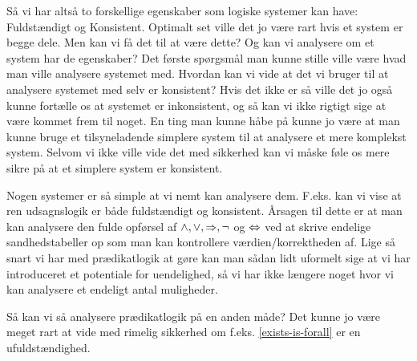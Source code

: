 Så vi har altså to forskellige egenskaber som logiske systemer kan have: Fuldstændigt og Konsistent.
Optimalt set ville det jo være rart hvis et system er begge dele.
Men kan vi få det til at være dette? Og kan vi analysere om et system har de egenskaber?
Det første spørgsmål man kunne stille ville være hvad man ville analysere systemet med. Hvordan kan vi vide at det
vi bruger til at analysere systemet med selv er konsistent? Hvis det ikke er så ville det jo også kunne fortælle
os at systemet er inkonsistent, og så kan vi ikke rigtigt sige at være kommet frem til noget.
En ting man kunne håbe på kunne jo være at man kunne bruge et tilsyneladende simplere system til at analysere et mere komplekst system.
Selvom vi ikke ville vide det med sikkerhed kan vi måske føle os mere sikre på at et simplere system er konsistent.

Nogen systemer er så simple at vi nemt kan analysere dem. F.eks. kan vi vise at ren udsagnslogik er både fuldstændigt og konsistent.
Årsagen til dette er at man kan analysere den fulde opførsel af $\land,\lor,\Rightarrow,\neg$ og $\Leftrightarrow$ ved at skrive endelige sandhedstabeller op som man
kan kontrollere værdien/korrektheden af. Lige så snart vi har med prædikatlogik at gøre kan man sådan lidt uformelt sige at vi
har introduceret et potentiale for uendelighed, så vi har ikke længere noget hvor vi kan analysere et endeligt antal muligheder.

Så kan vi så analysere prædikatlogik på en anden måde? Det kunne jo være meget rart at vide med rimelig sikkerhed om 
f.eks. \eqref{exists-is-forall} er en ufuldstændighed.

\ifdefined\startGoedel\fi
